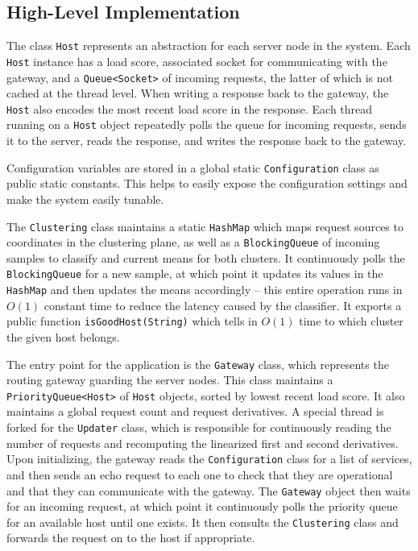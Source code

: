 \documentclass[twocolumn]{article}
\begin{document}
\subsection{High-Level Implementation}

The class \texttt{Host} represents an abstraction for each server node in the system. Each \texttt{Host} instance has a load score, associated socket for communicating with the gateway, and a \texttt{Queue<Socket>} of incoming requests, the latter of which is not cached at the thread level. When writing a response back to the gateway, the \texttt{Host} also encodes the most recent load score in the response. Each thread running on a \texttt{Host} object repeatedly polls the queue for incoming requests, sends it to the server, reads the response, and writes the response back to the gateway.

Configuration variables are stored in a global static \texttt{Configuration} class as public static constants. This helps to easily expose the configuration settings and make the system easily tunable.

The \texttt{Clustering} class maintains a static \texttt{HashMap} which maps request sources to coordinates in the clustering plane, as well as a \texttt{BlockingQueue} of incoming samples to classify and current means for both clusters. It continuously polls the \texttt{BlockingQueue} for a new sample, at which point it updates its values in the \texttt{HashMap} and then updates the means accordingly -- this entire operation runs in $O(1)$ constant time to reduce the latency caused by the classifier. It exports a public function \texttt{isGoodHost(String)} which tells in $O(1)$ time to which cluster the given host belongs.

The entry point for the application is the \texttt{Gateway} class, which represents the routing gateway guarding the server nodes. This class maintains a \texttt{PriorityQueue<Host>} of \texttt{Host} objects, sorted by lowest recent load score. It also maintains a global request count and request derivatives. A special thread is forked for the \texttt{Updater} class, which is responsible for continuously reading the number of requests and recomputing the linearized first and second derivatives. Upon initializing, the gateway reads the \texttt{Configuration} class for a list of services, and then sends an echo request to each one to check that they are operational and that they can communicate with the gateway. The \texttt{Gateway} object then waits for an incoming request, at which point it continuously polls the priority queue for an available host until one exists. It then consults the \texttt{Clustering} class and forwards the request on to the host if appropriate.
\end{document}
